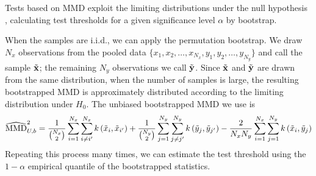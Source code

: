\documentclass[a4paper,12pt]{article}
\begin{document}
Tests based on MMD exploit the limiting distributions under the null hypothesis \cite{gretton_kernel_2012, chwialkowski_wild_2016}, calculating test thresholds for a given significance level $\alpha$ by bootstrap.

When the samples are i.i.d., we can apply the permutation bootstrap. We draw $N_{x}$ observations from the pooled data $\{x_{1}, x_{2}, \ldots, x_{N_{x}}, y_{1}, y_{2}, \ldots, y_{N_{y}} \}$ and call the sample $\Tilde{\mathbf{x}}$; the remaining $N_{y}$ observations we call $\Tilde{\mathbf{y}}$. Since $\Tilde{\mathbf{x}}$ and $\Tilde{\mathbf{y}}$ are drawn from the same distribution, when the number of samples is large, the resulting bootstrapped MMD is approximately distributed according to the limiting distribution under $H_{0}$. The unbiased bootstrapped MMD we use is
\begin{equation}
    \widehat{\mathrm{MMD}}_{U, b}^{2} = \frac{1}{{N_{x}\choose 2}} \sum_{i = 1}^{N_{x}} \sum_{i \neq i'}^{N_{x}} k\left(\Tilde{x}_{i}, \Tilde{x}_{i'}\right)+\frac{1}{{N_{y}\choose 2}} \sum_{j = 1}^{N_{y}} \sum_{j \neq j'}^{N_{y}} k\left(\Tilde{y}_{j}, \Tilde{y}_{j'}\right)-\frac{2}{N_{x}N_{y}} \sum_{i = 1}^{N_{x}} \sum_{j = 1}^{N_{y}} k\left(\Tilde{x}_{i}, \Tilde{y}_{j}\right)
    \label{eq:mmd_unbiased_permute}
\end{equation}
Repeating this process many times, we can estimate the test threshold using the $1-\alpha$ empirical quantile of the bootstrapped statistics.
\end{document}
